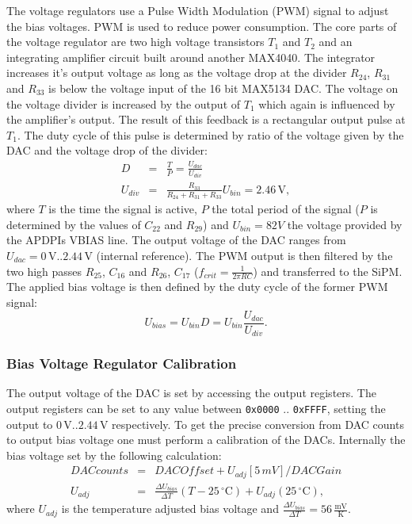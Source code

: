 The voltage regulators use a Pulse Width Modulation (PWM) signal to adjust the bias voltages. PWM is used to reduce power consumption.
The core parts of the voltage regulator are two high voltage transistors $T_1$ and $T_2$ and an integrating amplifier circuit built around another MAX4040. The integrator increases
it's output voltage as long as the voltage drop at the divider $R_{24}$, $R_{31}$ and $R_{33}$ is below the voltage input of the 16 bit MAX5134 DAC.
The voltage on the voltage divider is increased by the output of $T_1$ which again is influenced by the amplifier's output. The result of this feedback is a rectangular output
pulse at $T_1$. The duty cycle of this pulse is determined by ratio of the voltage given by the DAC and the voltage drop of the divider:
	\begin{eqnarray}
		D &=& \frac{T}{P} = \frac{U_{dac}}{U_{div}} \\
		U_{div} &=& \frac{R_{33}}{R_{24} + R_{31} + R_{33}} U_{bin} = 2.46\,\text{V},
	\end{eqnarray}
where $T$ is the time the signal is active, $P$ the total period of the signal ($P$ is determined by the values of $C_{22}$ and $R_{29}$) and $U_{bin}=82V$ the voltage provided by the 
APDPIs VBIAS line. The output voltage of the DAC ranges from $U_{dac}=0\, \text{V} .. 2.44\, \text{V}$ (internal reference). The PWM output is then filtered by the two high passes 
$R_{25}$, $C_{16}$ and $R_{26}$, $C_{17}$ ($f_{crit} = \frac{1}{2 \pi RC}$) and transferred to the SiPM. The applied bias voltage is then defined by the duty cycle of the former 
PWM signal:
	\begin{equation}
		U_{bias} = U_{bin} D = U_{bin} \frac{U_{dac}}{U_{div}}.
	\end{equation}

\subsubsection{Bias Voltage Regulator Calibration}
The output voltage of the DAC is set by accessing the output registers. The output registers can be set to any value between \verb|0x0000| .. \verb|0xFFFF|, setting the output to 
$0\, \text{V}..2.44\, \text{V}$ respectively. To get the precise conversion from DAC counts to output bias voltage one must perform a calibration of the DACs. Internally 
the bias voltage set by the following calculation:
	\begin{eqnarray}
		DACcounts &=& DACOffset + U_{adj}[5\,mV]/DACGain \\
		U_{adj} &=& \frac{\Delta U_{bias}}{\Delta T}(T - 25\,^{\circ} \text{C}) + U_{adj}(25\,^{\circ} \text{C}),
	\end{eqnarray} 
where $U_{adj}$ is the temperature adjusted bias voltage and $\frac{\Delta U_{bias}}{\Delta T} = 56\,\frac{\text{mV}}{\text{K}}$. 

